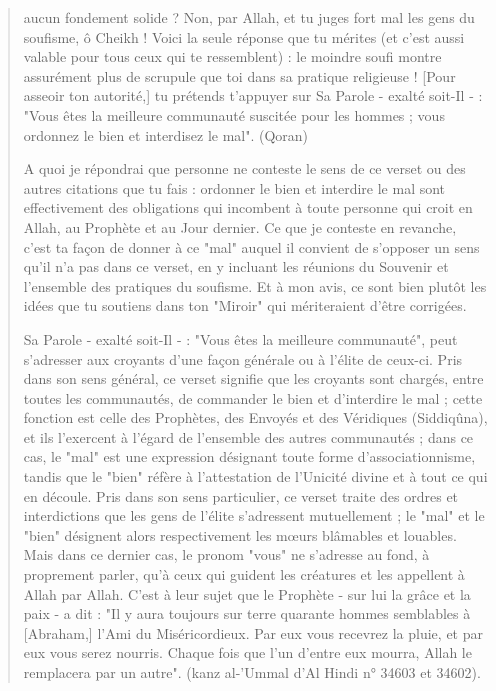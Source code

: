 \begin{quote}
aucun fondement solide ? Non, par Allah, et tu juges fort mal les gens
du soufisme, ô Cheikh ! Voici la seule réponse que tu mérites (et c'est
aussi valable pour tous ceux qui te ressemblent) : le moindre soufi
montre assurément plus de scrupule que toi dans sa pratique religieuse !
{[}Pour asseoir ton autorité,{]} tu prétends t'appuyer sur Sa Parole -
exalté soit-Il - : "Vous êtes la meilleure communauté suscitée pour les
hommes ; vous ordonnez le bien et interdisez le mal". (Qoran)

A quoi je répondrai que personne ne conteste le sens de ce verset ou des
autres citations que tu fais : ordonner le bien et interdire le mal sont
effectivement des obligations qui incombent à toute personne qui croit
en Allah, au Prophète et au Jour dernier. Ce que je conteste en
revanche, c'est ta façon de donner à ce "mal" auquel il convient de
s'opposer un sens qu'il n'a pas dans ce verset, en y incluant les
réunions du Souvenir et l'ensemble des pratiques du soufisme. Et à mon
avis, ce sont bien plutôt les idées que tu soutiens dans ton "Miroir"
qui mériteraient d'être corrigées.

Sa Parole - exalté soit-Il - : "Vous êtes la meilleure communauté", peut
s'adresser aux croyants d'une façon générale ou à l'élite de ceux-ci.
Pris dans son sens général, ce verset signifie que les croyants sont
chargés, entre toutes les communautés, de commander le bien et
d'interdire le mal ; cette fonction est celle des Prophètes, des Envoyés
et des Véridiques (Siddiqûna), et ils l'exercent à l'égard de l'ensemble
des autres communautés ; dans ce cas, le "mal" est une expression
désignant toute forme d'associationnisme, tandis que le "bien" réfère à
l'attestation de l'Unicité divine et à tout ce qui en découle. Pris dans
son sens particulier, ce verset traite des ordres et interdictions que
les gens de l'élite s'adressent mutuellement ; le "mal" et le "bien"
désignent alors respectivement les mœurs blâmables et louables. Mais
dans ce dernier cas, le pronom "vous" ne s'adresse au fond, à proprement
parler, qu'à ceux qui guident les créatures et les appellent à Allah par
Allah. C'est à leur sujet que le Prophète - sur lui la grâce et la paix
- a dit : "Il y aura toujours sur terre quarante hommes semblables à
{[}Abraham,{]} l'Ami du Miséricordieux. Par eux vous recevrez la pluie,
et par eux vous serez nourris. Chaque fois que l'un d'entre eux mourra,
Allah le remplacera par un autre". (kanz al-'Ummal d'Al Hindi n° 34603
et 34602).


\end{quote}
